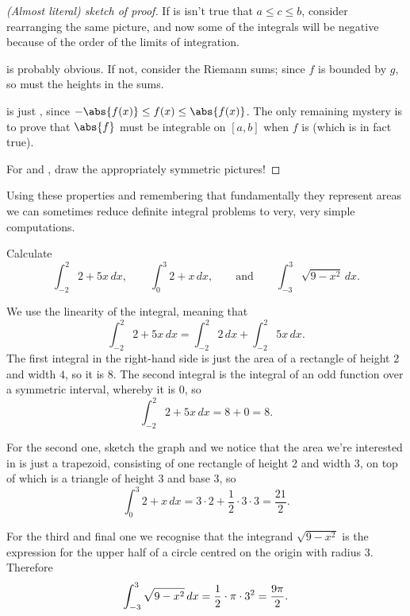 \begin{proof}[(Almost literal) sketch of proof]
	\noindent
	If is isn't true that $a \leq c \leq b$, consider rearranging the same picture, and now some of the integrals will be negative because of the order of the limits of integration.

	 is probably obvious.
	If not, consider the Riemann sums; since $f$ is bounded by $g$, so must the heights in the sums.

	 is just , since $-\abs{f(x)} \leq f(x) \leq \abs{f(x)}$.
	The only remaining mystery is to prove that $\abs{f}$ must be integrable on $[a, b]$ when $f$ is (which is in fact true).

	For  and , draw the appropriately symmetric pictures!
\end{proof}

\noindent
Using these properties and remembering that fundamentally they represent areas we can sometimes reduce definite integral problems to very, very simple computations.

\begin{examples}
	Calculate
	\[
		\int_{-2}^2 2 + 5 x \, d x, \qquad \int_0^3 2 + x \, d x, \qquad \text{and} \qquad \int_{-3}^3 \sqrt{9 - x^2} \, d x.
	\]

	\noindent
	We use the linearity of the integral, meaning that
	\[
		\int_{-2}^2 2 + 5 x \, d x = \int_{-2}^2 2 \, d x + \int_{-2}^2 5 x \, d x.
	\]
	The first integral in the right-hand side is just the area of a rectangle of height $2$ and width $4$, so it is $8$.
	The second integral is the integral of an odd function over a symmetric interval, whereby it is $0$, so
	\[
		\int_{-2}^2 2 + 5 x \, d x = 8 + 0 = 8.
	\]

	\noindent
	For the second one, sketch the graph and we notice that the area we're interested in is just a trapezoid, consisting of one rectangle of height 2 and width 3, on top of which is a triangle of height 3 and base 3, so
	\[
		\int_0^3 2 + x \, d x = 3 \cdot 2 + \frac{1}{2} \cdot 3 \cdot 3 = \frac{21}{2}.
	\]

	\noindent
	For the third and final one we recognise that the integrand $\sqrt{9 - x^2}$ is the expression for the upper half of a circle centred on the origin with radius 3.
	Therefore
	\[
		\int_{-3}^3 \sqrt{9 - x^2} \, d x = \frac{1}{2} \cdot \pi \cdot 3^2 = \frac{9 \pi}{2}. \qedhere
	\]
\end{examples}
